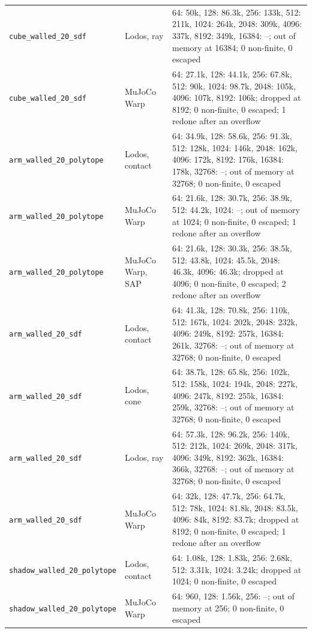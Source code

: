 \begin{longtable}{@{}llp{9.5cm}@{}}
\texttt{cube\_walled\_20\_sdf} & Lodos, ray & 64: 50k, 128: 86.3k, 256: 133k, 512: 211k, 1024: 264k, 2048: 309k, 4096: 337k, 8192: 349k, 16384: --; out of memory at 16384; 0 non-finite, 0 escaped \\
\texttt{cube\_walled\_20\_sdf} & MuJoCo Warp & 64: 27.1k, 128: 44.1k, 256: 67.8k, 512: 90k, 1024: 98.7k, 2048: 105k, 4096: 107k, 8192: 106k; dropped at 8192; 0 non-finite, 0 escaped; 1 redone after an overflow \\
\texttt{arm\_walled\_20\_polytope} & Lodos, contact & 64: 34.9k, 128: 58.6k, 256: 91.3k, 512: 128k, 1024: 146k, 2048: 162k, 4096: 172k, 8192: 176k, 16384: 178k, 32768: --; out of memory at 32768; 0 non-finite, 0 escaped \\
\texttt{arm\_walled\_20\_polytope} & MuJoCo Warp & 64: 21.6k, 128: 30.7k, 256: 38.9k, 512: 44.2k, 1024: --; out of memory at 1024; 0 non-finite, 0 escaped; 1 redone after an overflow \\
\texttt{arm\_walled\_20\_polytope} & MuJoCo Warp, SAP & 64: 21.6k, 128: 30.3k, 256: 38.5k, 512: 43.8k, 1024: 45.5k, 2048: 46.3k, 4096: 46.3k; dropped at 4096; 0 non-finite, 0 escaped; 2 redone after an overflow \\
\texttt{arm\_walled\_20\_sdf} & Lodos, contact & 64: 41.3k, 128: 70.8k, 256: 110k, 512: 167k, 1024: 202k, 2048: 232k, 4096: 249k, 8192: 257k, 16384: 261k, 32768: --; out of memory at 32768; 0 non-finite, 0 escaped \\
\texttt{arm\_walled\_20\_sdf} & Lodos, cone & 64: 38.7k, 128: 65.8k, 256: 102k, 512: 158k, 1024: 194k, 2048: 227k, 4096: 247k, 8192: 255k, 16384: 259k, 32768: --; out of memory at 32768; 0 non-finite, 0 escaped \\
\texttt{arm\_walled\_20\_sdf} & Lodos, ray & 64: 57.3k, 128: 96.2k, 256: 140k, 512: 212k, 1024: 269k, 2048: 317k, 4096: 349k, 8192: 362k, 16384: 366k, 32768: --; out of memory at 32768; 0 non-finite, 0 escaped \\
\texttt{arm\_walled\_20\_sdf} & MuJoCo Warp & 64: 32k, 128: 47.7k, 256: 64.7k, 512: 78k, 1024: 81.8k, 2048: 83.5k, 4096: 84k, 8192: 83.7k; dropped at 8192; 0 non-finite, 0 escaped; 1 redone after an overflow \\
\texttt{shadow\_walled\_20\_polytope} & Lodos, contact & 64: 1.08k, 128: 1.83k, 256: 2.68k, 512: 3.31k, 1024: 3.24k; dropped at 1024; 0 non-finite, 0 escaped \\
\texttt{shadow\_walled\_20\_polytope} & MuJoCo Warp & 64: 960, 128: 1.56k, 256: --; out of memory at 256; 0 non-finite, 0 escaped \\

\end{longtable}
